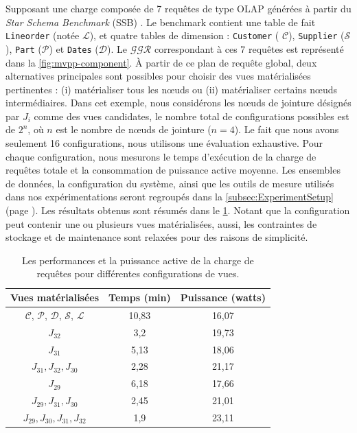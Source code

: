 \begin{example}
Supposant une charge composée de 7 requêtes de type OLAP générées à partir du \textit{Star Schema Benchmark} (SSB) \cite{Neil09}. Le benchmark contient une table de fait \texttt{Lineorder} (notée $\mathcal{L}$), et quatre tables de dimension : \texttt{Customer} ( $\mathcal{C}$), \texttt{Supplier} ($\mathcal{S}$), \texttt{Part} ($\mathcal{P}$) et \texttt{Dates} ($\mathcal{D}$). Le $\mathcal{GGR}$ correspondant à ces 7 requêtes est représenté dans la \ref{fig:mvpp-component}. À partir de ce plan de requête global, deux alternatives principales sont possibles pour choisir des vues matérialisées pertinentes : (i) matérialiser tous les nœuds ou (ii) matérialiser certains nœuds intermédiaires. Dans cet exemple, nous considérons les nœuds de jointure désignés par $J_i$ comme des vues candidates, le nombre total de configurations possibles est de $2^n$, où $n$ est le nombre de nœuds de jointure ($n = 4$). Le fait que nous avons seulement 16 configurations, nous utilisons une évaluation exhaustive. Pour chaque configuration, nous mesurons le temps d'exécution de la charge de requêtes totale et la consommation de puissance active moyenne. Les ensembles de données, la configuration du système, ainsi que les outils de mesure utilisés dans nos expérimentations seront regroupés dans la \ref{subsec:ExperimentSetup} (page \pageref{subsec:ExperimentSetup}). Les résultats obtenus sont résumés dans le \ref{tab:mvpp-example}. Notant que la configuration peut contenir une ou plusieurs vues matérialisées, aussi, les contraintes de stockage et de maintenance sont relaxées pour des raisons de simplicité.

\begin{table}
\centering
\caption{Les performances et la puissance active de la charge de requêtes pour différentes configurations de vues.} \label{tab:mvpp-example}
    \begin{tabular}{ccc}
    \toprule
    \textbf{Vues matérialisées} & \textbf{Temps (min)} & \textbf{Puissance (watts)} \\
    \midrule
    {$\mathcal{C}$, $\mathcal{P}$, $\mathcal{D}$, $\mathcal{S}$, $\mathcal{L}$} & 10,83 & 16,07 \\
    $J_{32}$ & 3,2 & 19,73 \\
    $J_{31}$ & 5,13 & 18,06 \\
    $J_{31},  J_{32},  J_{30}$ & 2,28 & 21,17 \\
    $J_{29}$ & 6,18 & 17,66 \\
    $J_{29}, J_{31}, J_{30}$ & 2,45 & 21,01 \\
    $J_{29}, J_{30}, J_{31}, J_{32}$ & 1,9 & 23,11 \\
    \bottomrule
    \end{tabular}
\end{table}


\end{example}
